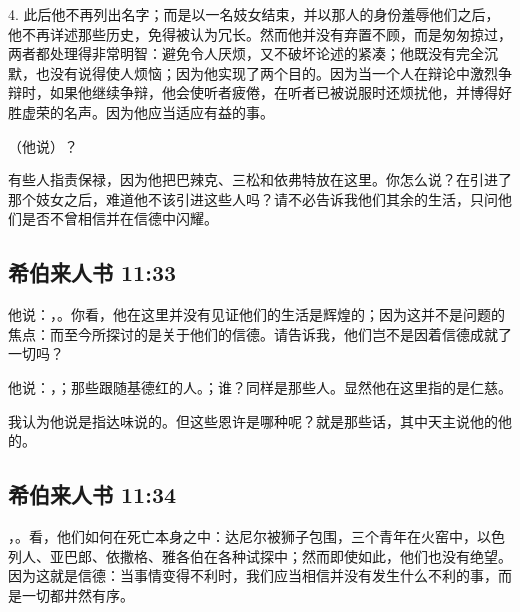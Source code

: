 4.   此后他不再列出名字；而是以一名妓女结束，并以那人的身份羞辱他们之后，他不再详述那些历史，免得被认为冗长。然而他并没有弃置不顾，而是匆匆掠过，两者都处理得非常明智：避免令人厌烦，又不破坏论述的紧凑；他既没有完全沉默，也没有说得使人烦恼；因为他实现了两个目的。因为当一个人在辩论中激烈争辩时，如果他继续争辩，他会使听者疲倦，在听者已被说服时还烦扰他，并博得好胜虚荣的名声。因为他应当适应有益的事。\par

（他说）？\par

有些人指责保禄，因为他把巴辣克、三松和依弗特放在这里。你怎么说？在引进了那个妓女之后，难道他不该引进这些人吗？请不必告诉我他们其余的生活，只问他们是否不曾相信并在信德中闪耀。\par


\subsection{希伯来人书 11:33}

他说：，。你看，他在这里并没有见证他们的生活是辉煌的；因为这并不是问题的焦点：而至今所探讨的是关于他们的信德。请告诉我，他们岂不是因着信德成就了一切吗？\par

他说：，；那些跟随基德红的人。；谁？同样是那些人。显然他在这里指的是仁慈。\par

我认为他说是指达味说的。但这些恩许是哪种呢？就是那些话，其中天主说他的他的。\par


\subsection{希伯来人书 11:34}

，。看，他们如何在死亡本身之中：达尼尔被狮子包围，三个青年在火窑中，以色列人、亚巴郎、依撒格、雅各伯在各种试探中；然而即使如此，他们也没有绝望。因为这就是信德：当事情变得不利时，我们应当相信并没有发生什么不利的事，而是一切都井然有序。\par

